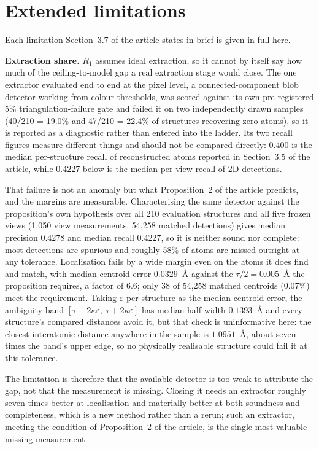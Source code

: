\section{Extended limitations}
\label{app:extraction}
Each limitation Section~3.7 of the article states in brief is given in full here.

\textbf{Extraction share.} $R_1$ assumes ideal extraction, so it cannot by itself say how much of the
ceiling-to-model gap a real extraction stage would close. The one extractor evaluated end to end at the
pixel level, a connected-component blob detector working from colour thresholds, was scored against its own
pre-registered 5\% triangulation-failure gate and failed it on two independently drawn samples (40/210 =
19.0\% and 47/210 = 22.4\% of structures recovering zero atoms), so it is reported as a diagnostic rather than
entered into the ladder. Its two recall figures measure different things and should not be compared directly:
0.400 is the median per-structure recall of reconstructed atoms reported in Section~3.5 of the article, while
0.4227 below is the median per-view recall of 2D detections.

That failure is not an anomaly but what Proposition~2 of the article predicts, and the margins are
measurable. Characterising the same detector against the proposition's own hypothesis over all 210
evaluation structures and all five frozen views (1{,}050 view measurements, 54{,}258 matched detections)
gives median precision 0.4278 and median recall 0.4227, so it is neither sound nor complete: most
detections are spurious and roughly 58\% of atoms are missed outright at any tolerance. Localisation fails
by a wide margin even on the atoms it does find and match, with median centroid error $0.0329$~\AA{}
against the $\tau/2 = 0.005$~\AA{} the proposition requires, a factor of $6.6$; only 38 of 54{,}258 matched
centroids ($0.07\%$) meet the requirement. Taking $\varepsilon$ per structure as the median centroid error,
the ambiguity band $[\tau - 2\kappa\varepsilon,\ \tau + 2\kappa\varepsilon]$ has median half-width
$0.1393$~\AA{} and every structure's compared distances avoid it, but that check is uninformative here: the
closest interatomic distance anywhere in the sample is $1.0951$~\AA{}, about seven times the band's upper
edge, so no physically realisable structure could fail it at this tolerance.

The limitation is therefore that the available detector is too weak to attribute the gap, not that the
measurement is missing. Closing it needs an extractor roughly seven times better at localisation and
materially better at both soundness and completeness, which is a new method rather than a rerun; such an
extractor, meeting the condition of Proposition~2 of the article, is the single most valuable missing
measurement.

